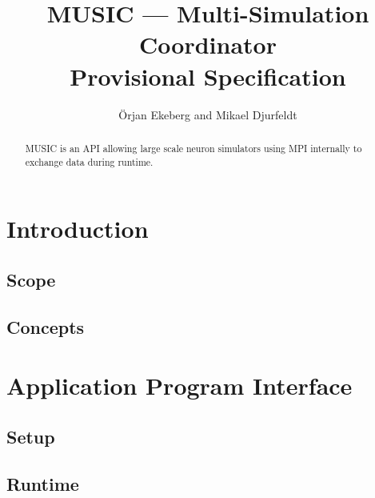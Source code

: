 \documentclass{report}
\title{MUSIC --- Multi-Simulation Coordinator\\Provisional
  Specification}
\author{Örjan Ekeberg and Mikael Djurfeldt}
\begin{document}
\maketitle

\begin{abstract}
  MUSIC is an API allowing large scale neuron simulators using MPI
  internally to exchange data during runtime.
\end{abstract}


\tableofcontents

\chapter{Introduction}

\section{Scope}

\section{Concepts}

\chapter{Application Program Interface}

\section{Setup}

\section{Runtime}
\end{document}
